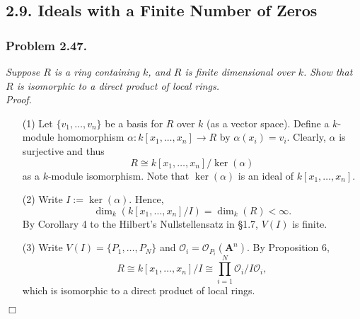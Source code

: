 \documentclass{article}
\begin{document}



\subsection*{2.9. Ideals with a Finite Number of Zeros \\}



\subsubsection*{Problem 2.47.}
\emph{Suppose $R$ is a ring containing $k$, and $R$ is finite dimensional over $k$.
Show that $R$ is isomorphic to a direct product of local rings.} \\



\emph{Proof.}
\begin{enumerate}
\item[(1)]
  Let $\{ v_1, \ldots, v_n \}$ be a basis for $R$ over $k$ (as a vector space).
  Define a $k$-module homomorphism $\alpha: k[x_1,\ldots,x_n] \to R$
  by $\alpha(x_i) = v_i$.
  Clearly, $\alpha$ is surjective and thus
  \[
    R \cong k[x_1,\ldots,x_n]/\ker(\alpha)
  \]
  as a $k$-module isomorphism.
  Note that $\ker(\alpha)$ is an ideal of $k[x_1,\ldots,x_n]$.

\item[(2)]
  Write $I := \ker(\alpha)$.
  Hence,
  \[
    \dim_k(k[x_1,\ldots,x_n]/I) = \dim_k(R) < \infty.
  \]
  By Corollary 4 to the Hilbert's Nullstellensatz in \S 1.7,
  $V(I)$ is finite.

\item[(3)]
  Write $V(I) = \{ P_1, \ldots, P_N \}$ and $\mathscr{O}_i = \mathscr{O}_{P_i}(\mathbf{A}^n)$.
  By Proposition 6,
  \[
    R \cong k[x_1,\ldots,x_n]/I \cong \prod_{i=1}^{N} \mathscr{O}_i/I\mathscr{O}_i,
  \]
  which is isomorphic to a direct product of local rings.
\end{enumerate}
$\Box$ \\\\



\end{document}

